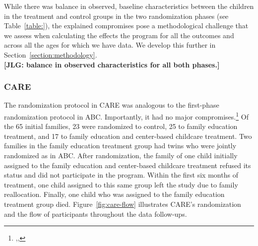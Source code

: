 \noindent While there was balance in observed, baseline characteristics between the children in the treatment and control groups in the two randomization phases (see Table~\ref{table:}), the explained compromises pose a methodological challenge that we assess when calculating the effects the program for all the outcomes and across all the ages for which we have data. We develop this further in Section~\ref{section:methodology}.\\

\noindent \textbf{[JLG: balance in observed characteristics for all both phases.]}\\

\subsubsection{CARE}

\noindent 
The randomization protocol in CARE was analogous to the first-phase randomization protocol in ABC. Importantly, it had no major compromises.\footnote{\citet{Bryant_et_al_1987_Carolina_Approach_TIECSE},\citet{Wasik_Ramey_etal_1990_CD},\citet{Burchinal_Campbell_etal_1997_CD}} Of the 65 initial families, 23 were randomized to control, 25 to family education treatment, and 17 to family education and center-based childcare treatment. Two families in the family education treatment group had twins who were jointly randomized as in ABC. After randomization, the family of one child initially assigned to the family education and center-based childcare treatment refused its status and did not participate in the program. Within the first six months of treatment, one child assigned to this same group left the study due to family reallocation. Finally, one child who was assigned to the family education treatment group died. Figure~\ref{fig:care-flow} illustrates CARE's randomization and the flow of participants throughout the data follow-ups.\\

